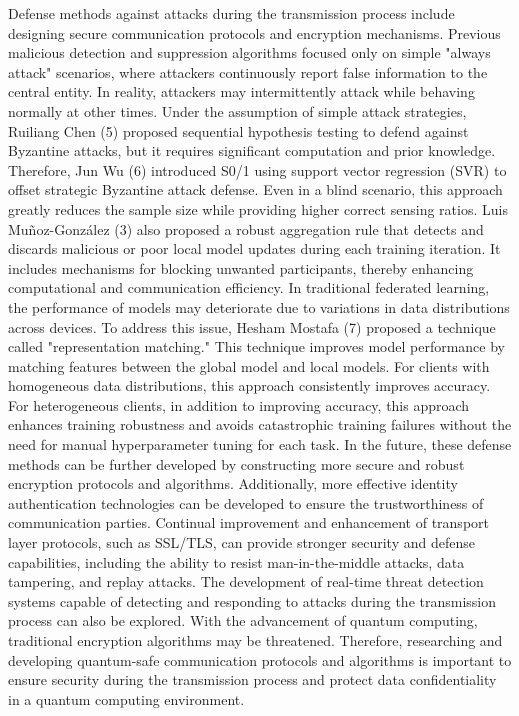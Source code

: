 \documentclass[conference]{IEEEtran}
\begin{document}
Defense methods against attacks during the transmission process include designing secure communication protocols and encryption mechanisms.
Previous malicious detection and suppression algorithms focused only on simple "always attack" scenarios, where attackers continuously report false information to the central entity. In reality, attackers may intermittently attack while behaving normally at other times. Under the assumption of simple attack strategies, Ruiliang Chen (5) proposed sequential hypothesis testing to defend against Byzantine attacks, but it requires significant computation and prior knowledge. Therefore, Jun Wu (6) introduced S0/1 using support vector regression (SVR) to offset strategic Byzantine attack defense. Even in a blind scenario, this approach greatly reduces the sample size while providing higher correct sensing ratios.
Luis Muñoz-González (3) also proposed a robust aggregation rule that detects and discards malicious or poor local model updates during each training iteration. It includes mechanisms for blocking unwanted participants, thereby enhancing computational and communication efficiency.
In traditional federated learning, the performance of models may deteriorate due to variations in data distributions across devices. To address this issue, Hesham Mostafa (7) proposed a technique called "representation matching." This technique improves model performance by matching features between the global model and local models. For clients with homogeneous data distributions, this approach consistently improves accuracy. For heterogeneous clients, in addition to improving accuracy, this approach enhances training robustness and avoids catastrophic training failures without the need for manual hyperparameter tuning for each task.
In the future, these defense methods can be further developed by constructing more secure and robust encryption protocols and algorithms. Additionally, more effective identity authentication technologies can be developed to ensure the trustworthiness of communication parties. Continual improvement and enhancement of transport layer protocols, such as SSL/TLS, can provide stronger security and defense capabilities, including the ability to resist man-in-the-middle attacks, data tampering, and replay attacks. The development of real-time threat detection systems capable of detecting and responding to attacks during the transmission process can also be explored. With the advancement of quantum computing, traditional encryption algorithms may be threatened. Therefore, researching and developing quantum-safe communication protocols and algorithms is important to ensure security during the transmission process and protect data confidentiality in a quantum computing environment.
\end{document}
